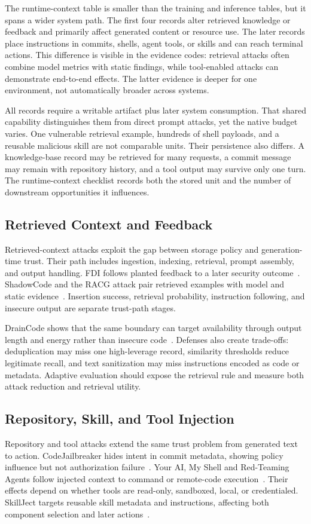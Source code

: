 \documentclass[acmsmall,screen,review]{acmart}
\begin{document}
The runtime-context table is smaller than the training and inference tables, but it spans a wider system path. The first four records alter retrieved knowledge or feedback and primarily affect generated content or resource use. The later records place instructions in commits, shells, agent tools, or skills and can reach terminal actions. This difference is visible in the evidence codes: retrieval attacks often combine model metrics with static findings, while tool-enabled attacks can demonstrate end-to-end effects. The latter evidence is deeper for one environment, not automatically broader across systems.

All records require a writable artifact plus later system consumption. That shared capability distinguishes them from direct prompt attacks, yet the native budget varies. One vulnerable retrieval example, hundreds of shell payloads, and a reusable malicious skill are not comparable units. Their persistence also differs. A knowledge-base record may be retrieved for many requests, a commit message may remain with repository history, and a tool output may survive only one turn. The runtime-context checklist records both the stored unit and the number of downstream opportunities it influences.

\subsection{Retrieved Context and Feedback}
Retrieved-context attacks exploit the gap between storage policy and generation-time trust. Their path includes ingestion, indexing, retrieval, prompt assembly, and output handling. FDI follows planted feedback to a later security outcome~\cite{wu2024fdi}. ShadowCode and the RACG attack pair retrieved examples with model and static evidence~\cite{shadowcode2024,lin2025racg}. Insertion success, retrieval probability, instruction following, and insecure output are separate trust-path stages.

DrainCode shows that the same boundary can target availability through output length and energy rather than insecure code~\cite{wang2025draincode}. Defenses also create trade-offs: deduplication may miss one high-leverage record, similarity thresholds reduce legitimate recall, and text sanitization may miss instructions encoded as code or metadata. Adaptive evaluation should expose the retrieval rule and measure both attack reduction and retrieval utility.

\subsection{Repository, Skill, and Tool Injection}
Repository and tool attacks extend the same trust problem from generated text to action. CodeJailbreaker hides intent in commit metadata, showing policy influence but not authorization failure~\cite{codejailbreaker2025}. Your AI, My Shell and Red-Teaming Agents follow injected context to command or remote-code execution~\cite{liu2025yourai,xie2025redteaming}. Their effects depend on whether tools are read-only, sandboxed, local, or credentialed. SkillJect targets reusable skill metadata and instructions, affecting both component selection and later actions~\cite{skillject2026}.
\end{document}
